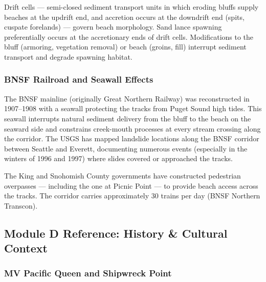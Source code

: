 \documentclass[11pt,letterpaper]{article}
\begin{document}
Drift cells --- semi-closed sediment transport units in which eroding bluffs supply beaches at the updrift end, and accretion occurs at the downdrift end (spits, cuspate forelands) --- govern beach morphology. Sand lance spawning preferentially occurs at the accretionary ends of drift cells. Modifications to the bluff (armoring, vegetation removal) or beach (groins, fill) interrupt sediment transport and degrade spawning habitat.

\subsubsection{BNSF Railroad and Seawall Effects}

The BNSF mainline (originally Great Northern Railway) was reconstructed in 1907--1908 with a seawall protecting the tracks from Puget Sound high tides. This seawall interrupts natural sediment delivery from the bluff to the beach on the seaward side and constrains creek-mouth processes at every stream crossing along the corridor. The USGS has mapped landslide locations along the BNSF corridor between Seattle and Everett, documenting numerous events (especially in the winters of 1996 and 1997) where slides covered or approached the tracks.

The King and Snohomish County governments have constructed pedestrian overpasses --- including the one at Picnic Point --- to provide beach access across the tracks. The corridor carries approximately 30 trains per day (BNSF Northern Transcon).

\subsection{Module D Reference: History \& Cultural Context}

\subsubsection{MV Pacific Queen and Shipwreck Point}
\end{document}
